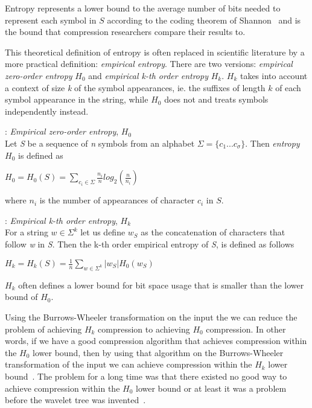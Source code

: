 Entropy represents a lower bound to the average number of bits needed to represent each symbol in $S$ according to the coding theorem of Shannon~\citep[Introduction]{WTSurvey} and is the bound that compression researchers compare their results to.

This theoretical definition of entropy is often replaced in scientific literature by a more practical definition: \textit{empirical entropy}.
There are two versions: \textit{empirical zero-order entropy} $H_0$ and \textit{empirical k-th order entropy} $H_k$. $H_k$ takes into account a context of size \textit{k} of the symbol appearances, ie. the suffixes of length $k$ of each symbol appearance in the string, while $H_0$ does not and treats symbols independently instead. 

\begin{mdframed}[nobreak, linecolor=lightgray, linewidth=2pt]
\begin{definition}: \textit{Empirical zero-order entropy}, $H_0$ \\
Let \textit{S} be a sequence of \textit{n} symbols from an alphabet $\Sigma = \lbrace c_1 ... c_\sigma \rbrace$.
Then \textit{entropy} $H_0$ is defined as
\begin{center}
$H_0 = H_0(S) = \sum\limits_{c_i \in \Sigma} \frac{n_i}{n} log_2(\frac{n}{n_i})$
\end{center}
where $n_i$ is the number of appearances of character $c_i$ in $S$.
\end{definition}
\begin{definition}: \textit{Empirical k-th order entropy}, $H_k$ \\
For a string $w \in \Sigma^k$ let us define $w_S$ as the concatenation of characters that follow \textit{w} in \textit{S}. 
Then the k-th order empirical entropy of \textit{S}, is defined as follows
\begin{center}
$H_k = H_k(S) = \frac{1}{n} \sum\limits_{w \in \Sigma^k} | w_S |H_0(w_S)$
\end{center}
\end{definition}
\end{mdframed}
$H_k$ often defines a lower bound for bit space usage that is smaller than the lower bound of $H_0$\citep[Section~2]{waveletTreeEntropy}.

Using the Burrows-Wheeler transformation on the input the we can reduce the problem of achieving $H_k$ compression to achieving $H_0$ compression.
In other words, if we have a good compression algorithm that achieves compression within the $H_0$ lower bound, then by using that algorithm on the Burrows-Wheeler transformation of the input we can achieve compression within the $H_k$ lower bound~\citep[Introduction]{waveletTreeEntropy}.
The problem for a long time was that there existed no good way to achieve compression within the $H_0$ lower bound or at least it was a problem before the wavelet tree was invented~\citep[Introduction]{waveletTreeEntropy}.

